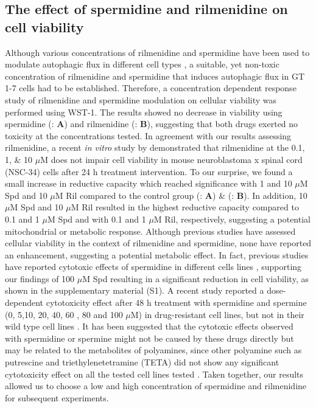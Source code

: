 {\subsection{The effect of spermidine and rilmenidine on cell viability}

Although various concentrations of rilmenidine and spermidine have been used to modulate autophagic flux in different cell types \citep{Perera2018,Wang2018}, a suitable, yet non-toxic concentration of rilmenidine and spermidine that induces autophagic flux in GT 1-7 cells had to be established. Therefore, a concentration dependent response study of rilmenidine and spermidine modulation on cellular viability was performed using WST-1. The results showed no decrease in viability using spermidine (: \textbf{A}) and rilmenidine (: \textbf{B}), suggesting that both drugs exerted no toxicity at the concentrations tested. In agreement with our results assessing rilmenidine,  a recent \textit{in vitro} study by \citet{Perera2018} demonstrated that rilmenidine  at the  0.1, 1, \& 10 $\mu$M does not impair cell viability in mouse neuroblastoma x spinal cord (NSC-34) cells after 24 h treatment intervention. To our surprise, we found a small increase in reductive capacity which reached significance with 1 and 10 $\mu$M Spd and 10 $\mu$M Ril compared to the control group (: \textbf{A})  \& (: \textbf{B}). In addition, 10 $\mu$M Spd and 10 $\mu$M Ril resulted in the highest reductive capacity compared to 0.1 and 1 $\mu$M Spd and with 0.1 and 1 $\mu$M Ril, respectively, suggesting a potential mitochondrial or metabolic response. Although previous studies have assessed cellular viability in the context of rilmenidine and spermidine, none have reported an enhancement, suggesting a potential metabolic effect. In fact, previous studies  have reported cytotoxic effects of spermidine in different cells lines \citep{He1993,Poulin1995,Poulin1993}, supporting our findings of 100 $\mu$M Spd resulting in a significant reduction in cell viability, as shown in the supplementary material (S1). A recent study reported a dose-dependent cytotoxicity effect after 48 h treatment with spermidine and spermine (0, 5,10, 20, 40, 60 , 80 and 100 $\mu$M) in drug-resistant cell lines, but not in their wild type cell lines \citep{Wang2018}. It has been suggested that the cytotoxic effects observed with spermidine or spermine might not be caused by these drugs directly but may be related to the metabolites of polyamines, since other polyamine such as putrescine and triethylenetetramine (TETA) did not show any significant cytotoxicity effect on all the tested cell lines tested \citep{Wang2018}. Taken together, our results allowed us to choose a low and high concentration of spermidine and rilmenidine for subsequent experiments.

}
